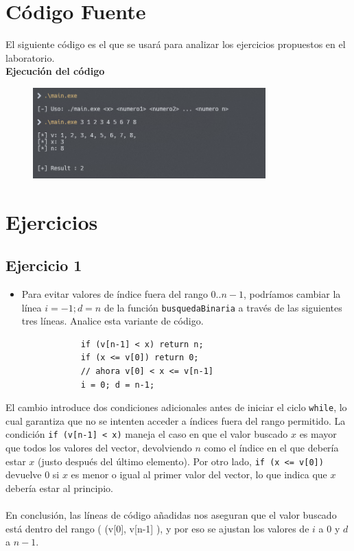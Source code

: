 \documentclass{article}
\begin{document}
\section{Código Fuente}
    El siguiente código es el que se usará para analizar los ejercicios propuestos en el laboratorio.
    \\
    

    \textbf{Ejecución del código}
        \begin{figure}[H]
        	\centering
         	\includegraphics[width=0.8\textwidth,keepaspectratio]{img/main.png}
        \end{figure}

\section{Ejercicios}
    \subsection{Ejercicio 1}
        \begin{itemize}
            \item Para evitar valores de índice fuera del rango \(0..n-1\), podríamos cambiar la línea \(i = -1; d = n\) de la función \texttt{busquedaBinaria} a través de las siguientes tres líneas. Analice esta variante de código.

            \begin{verbatim}
            if (v[n-1] < x) return n;
            if (x <= v[0]) return 0;
            // ahora v[0] < x <= v[n-1]
            i = 0; d = n-1;
            \end{verbatim}
        \end{itemize}

        El cambio introduce dos condiciones adicionales antes de iniciar el ciclo \texttt{while}, lo cual garantiza que no se intenten acceder a índices fuera del rango permitido. La condición \texttt{if (v[n-1] < x)} maneja el caso en que el valor buscado \( x \) es mayor que todos los valores del vector, devolviendo \( n \) como el índice en el que debería estar \( x \) (justo después del último elemento). Por otro lado, \texttt{if (x <= v[0])} devuelve \( 0 \) si \( x \) es menor o igual al primer valor del vector, lo que indica que \( x \) debería estar al principio.\\\\
        En conclusión, las líneas de código añadidas nos aseguran que el valor buscado está dentro del rango ( (v[0], v[n-1] ), y por eso se ajustan los valores de \( i \) a \( 0 \) y \( d \) a \( n-1 \).
\end{document}

